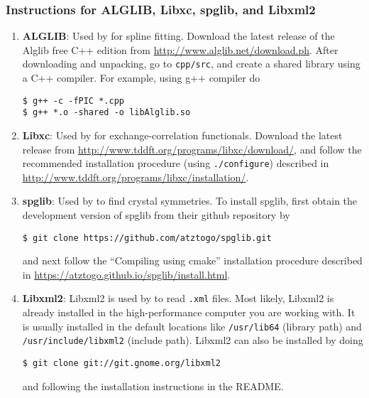 \subsubsection{Instructions for ALGLIB, Libxc, spglib, and Libxml2}
\begin{enumerate}
	\item   {\bf ALGLIB}: Used by \dftfe{} for spline fitting. Download the latest release of the Alglib free C++ edition from \url{http://www.alglib.net/download.ph}. After downloading and unpacking, go to \verb|cpp/src|, and create a shared library using a C++ compiler. For example, using g++ compiler do
\begin{verbatim}
$ g++ -c -fPIC *.cpp
$ g++ *.o -shared -o libAlglib.so
\end{verbatim}
\item {\bf Libxc}: Used by \dftfe{} for exchange-correlation functionals. Download the latest release from \url{http://www.tddft.org/programs/libxc/download/}, and follow the recommended installation procedure (using \verb|./configure|) described in \url{http://www.tddft.org/programs/libxc/installation/}.

\item {\bf spglib}: Used by \dftfe{} to find crystal symmetries. To install spglib, first obtain the development version of spglib from their github repository by
\begin{verbatim}
$ git clone https://github.com/atztogo/spglib.git	
\end{verbatim}	
and next follow the ``Compiling using cmake'' installation procedure described in \url{https://atztogo.github.io/spglib/install.html}.   	

\item {\bf Libxml2}: Libxml2 is used by \dftfe{} to read \verb|.xml| files. Most likely, Libxml2 is already installed in the high-performance computer you are working with. It is usually installed in the default locations like \verb|/usr/lib64| (library path) and \verb|/usr/include/libxml2| (include path). Libxml2 can also be installed by doing
\begin{verbatim}
$ git clone git://git.gnome.org/libxml2	
\end{verbatim}
and following the installation instructions in the README.
\end{enumerate}

